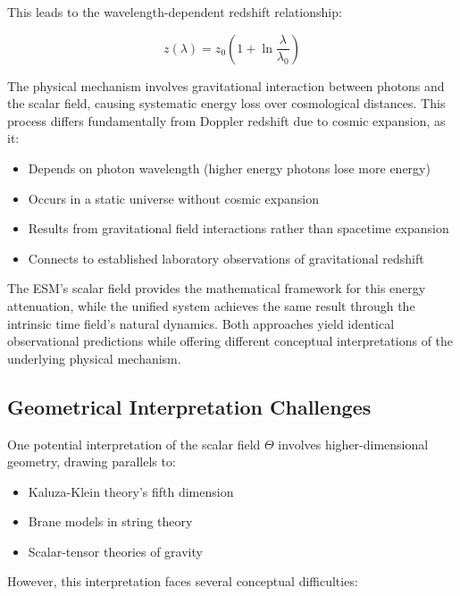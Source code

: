 \documentclass[12pt,a4paper]{article}
\begin{document}
	This leads to the wavelength-dependent redshift relationship:
	
	\begin{equation}
		z(\lambda) = z_0\left(1 + \ln\frac{\lambda}{\lambda_0}\right)
	\end{equation}
	
	The physical mechanism involves gravitational interaction between photons and the scalar field, causing systematic energy loss over cosmological distances. This process differs fundamentally from Doppler redshift due to cosmic expansion, as it:
	
	\begin{itemize}
		\item Depends on photon wavelength (higher energy photons lose more energy)
		\item Occurs in a static universe without cosmic expansion
		\item Results from gravitational field interactions rather than spacetime expansion
		\item Connects to established laboratory observations of gravitational redshift \cite{Pound1960,Bertotti2003}
	\end{itemize}
	
	The ESM's scalar field provides the mathematical framework for this energy attenuation, while the unified system achieves the same result through the intrinsic time field's natural dynamics. Both approaches yield identical observational predictions while offering different conceptual interpretations of the underlying physical mechanism.
	
	\subsection{Geometrical Interpretation Challenges}
	\label{subsec:geometrical_challenges}
	
	One potential interpretation of the scalar field $\Theta$ involves higher-dimensional geometry, drawing parallels to:
	
	\begin{itemize}
		\item Kaluza-Klein theory's fifth dimension \cite{Kaluza1921,Klein1926}
		\item Brane models in string theory \cite{Randall1999}
		\item Scalar-tensor theories of gravity \cite{Brans1961}
	\end{itemize}
	
	However, this interpretation faces several conceptual difficulties:
	
\end{document}
